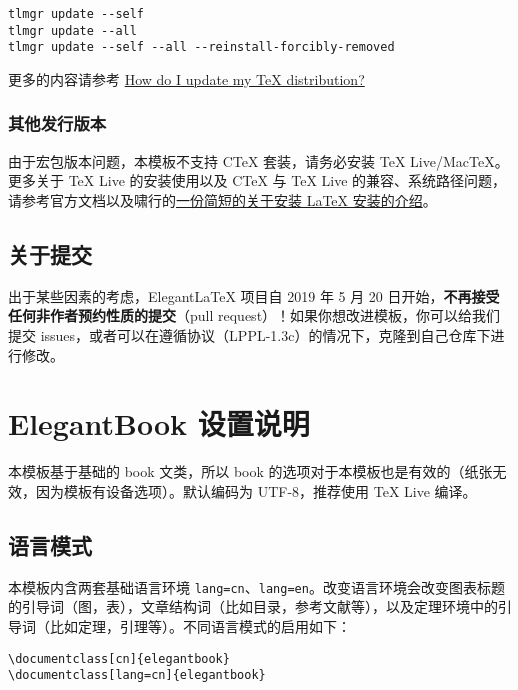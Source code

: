 \documentclass[lang=cn,10pt]{elegantbook}
\begin{document}
\begin{lstlisting}
tlmgr update --self 
tlmgr update --all
tlmgr update --self --all --reinstall-forcibly-removed
\end{lstlisting}

更多的内容请参考 \href{https://tex.stackexchange.com/questions/55437/how-do-i-update-my-tex-distribution}{How do I update my \TeX{} distribution?}

\subsection{其他发行版本}

由于宏包版本问题，本模板不支持 C\TeX{} 套装，请务必安装 TeX Live/Mac\TeX{}。更多关于 \TeX{} Live 的安装使用以及 C\TeX{} 与 \TeX{} Live 的兼容、系统路径问题，请参考官方文档以及啸行的\href{https://github.com/OsbertWang/install-latex-guide-zh-cn/releases/}{一份简短的关于安装 \LaTeX{} 安装的介绍}。


\section{关于提交}

出于某些因素的考虑，Elegant\LaTeX{} 项目自 2019 年 5 月 20 日开始，\textbf{不再接受任何非作者预约性质的提交}（pull request）！如果你想改进模板，你可以给我们提交 issues，或者可以在遵循协议（LPPL-1.3c）的情况下，克隆到自己仓库下进行修改。


\chapter{ElegantBook 设置说明}

本模板基于基础的 book 文类，所以 book 的选项对于本模板也是有效的（纸张无效，因为模板有设备选项）。默认编码为 UTF-8，推荐使用 \TeX{} Live 编译。

\section{语言模式}
本模板内含两套基础语言环境 \lstinline{lang=cn}、\lstinline{lang=en}。改变语言环境会改变图表标题的引导词（图，表），文章结构词（比如目录，参考文献等），以及定理环境中的引导词（比如定理，引理等）。不同语言模式的启用如下：
\begin{lstlisting}
\documentclass[cn]{elegantbook} 
\documentclass[lang=cn]{elegantbook}
\end{lstlisting}
\end{document}
